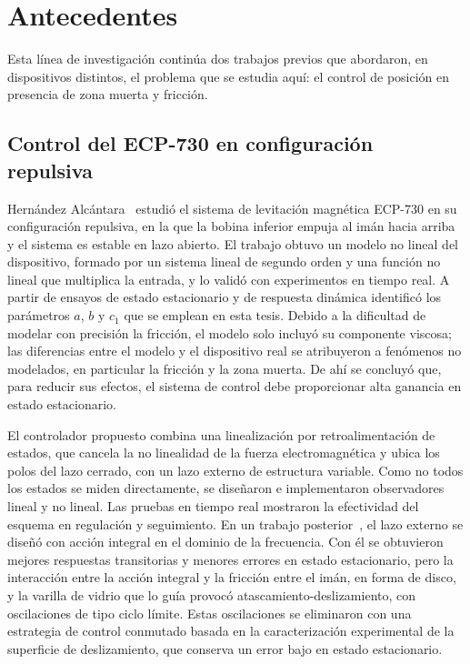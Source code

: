 \chapter{Antecedentes}\label{Chap:Antecedentes}

Esta línea de investigación continúa dos trabajos previos que abordaron, en dispositivos distintos, el problema que se estudia aquí: el control de posición en presencia de zona muerta y fricción.

\section{Control del ECP-730 en configuración repulsiva}

Hernández Alcántara~\cite{diana_tesis} estudió el sistema de levitación magnética ECP-730 en su configuración repulsiva, en la que la bobina inferior empuja al imán hacia arriba y el sistema es estable en lazo abierto. El trabajo obtuvo un modelo no lineal del dispositivo, formado por un sistema lineal de segundo orden y una función no lineal que multiplica la entrada, y lo validó con experimentos en tiempo real. A partir de ensayos de estado estacionario y de respuesta dinámica identificó los parámetros $a$, $b$ y $c_1$ que se emplean en esta tesis. Debido a la dificultad de modelar con precisión la fricción, el modelo solo incluyó su componente viscosa; las diferencias entre el modelo y el dispositivo real se atribuyeron a fenómenos no modelados, en particular la fricción y la zona muerta. De ahí se concluyó que, para reducir sus efectos, el sistema de control debe proporcionar alta ganancia en estado estacionario.

El controlador propuesto combina una linealización por retroalimentación de estados, que cancela la no linealidad de la fuerza electromagnética y ubica los polos del lazo cerrado, con un lazo externo de estructura variable. Como no todos los estados se miden directamente, se diseñaron e implementaron observadores lineal y no lineal. Las pruebas en tiempo real mostraron la efectividad del esquema en regulación y seguimiento. En un trabajo posterior~\cite{alcantara}, el lazo externo se diseñó con acción integral en el dominio de la frecuencia. Con él se obtuvieron mejores respuestas transitorias y menores errores en estado estacionario, pero la interacción entre la acción integral y la fricción entre el imán, en forma de disco, y la varilla de vidrio que lo guía provocó atascamiento-deslizamiento, con oscilaciones de tipo ciclo límite. Estas oscilaciones se eliminaron con una estrategia de control conmutado basada en la caracterización experimental de la superficie de deslizamiento, que conserva un error bajo en estado estacionario.

